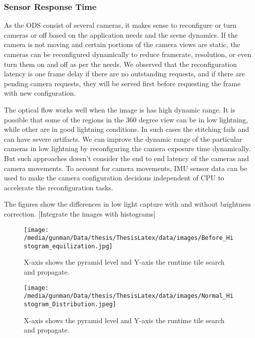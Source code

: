 \subsubsection{Sensor Response Time}
As the ODS consist of several cameras, it makes sense to reconfigure or turn cameras or off based on the application needs and the scene dynamics. If the camera is not moving and certain portions of the camera views are static, the cameras can be reconfigured dynamically to reduce framerate, resolution, or even turn them on and off as per the needs. We observed that the reconfiguration latency is one frame delay if there are no outstanding requests, and if there are pending camera requests, they will be served first before requesting the frame with new configuration. 

The optical flow works well when the image is has high dynamic range. It is possible that some of the regions in the 360 degree view can be in low lightning, while other are in good lightning conditions. In such cases the stitching fails and can have severe artifacts. We can improve the dynamic range of the particular cameras in low lightning by reconfiguring the camera exposure time dynamically. But such approaches doesn't consider the end to end latency of the cameras and camera movements. To account for camera movements, IMU sensor data can be used to make the camera configuration decisions independent of CPU to accelerate the reconfiguration tasks. 

The figures show the differences in low light capture with and without brightness correction.
[Integrate the images with histograms]\newline
	\begin{figure}[h]
	\begin{center}
		\texttt{[image: /media/gunman/Data/thesis/ThesisLatex/data/images/Before\_Histogram\_equilization.jpg]}
		\caption{X-axis shows the pyramid level and Y-axis the runtime tile search and propagate.}
		\label{fig:ex_4_9}
	\end{center}
	\vspace{-0.3in}
\end{figure} 

\begin{figure}[h]
	\begin{center}
		\texttt{[image: /media/gunman/Data/thesis/ThesisLatex/data/images/Normal\_Histogram\_Distribution.jpeg]}
		\caption{X-axis shows the pyramid level and Y-axis the runtime tile search and propagate.}
		\label{fig:ex_4_9}
	\end{center}
	\vspace{-0.3in}
\end{figure} 

